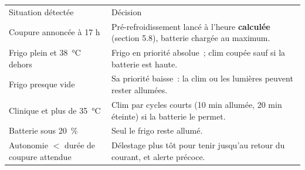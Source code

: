 \documentclass[10pt,a4paper]{article}
\begin{document}
\begin{tabularx}{\linewidth}{Q{5cm}L}
 Situation détectée & \mdseries Décision \\
Coupure annoncée à 17 h & Pré-refroidissement lancé à l'heure \textbf{calculée} (section 5.8), batterie chargée au maximum. \\
Frigo plein et 38~°C dehors & Frigo en priorité absolue~; clim coupée sauf si la batterie est haute. \\
Frigo presque vide & Sa priorité baisse~: la clim ou les lumières peuvent rester allumées. \\
Clinique et plus de 35~°C & Clim par cycles courts (10 min allumée, 20 min éteinte) si la batterie le permet. \\
Batterie sous 20~\% & Seul le frigo reste allumé. \\
Autonomie $<$ durée de coupure attendue & Délestage plus tôt pour tenir jusqu'au retour du courant, et alerte précoce. \\
\end{tabularx}
\end{document}
